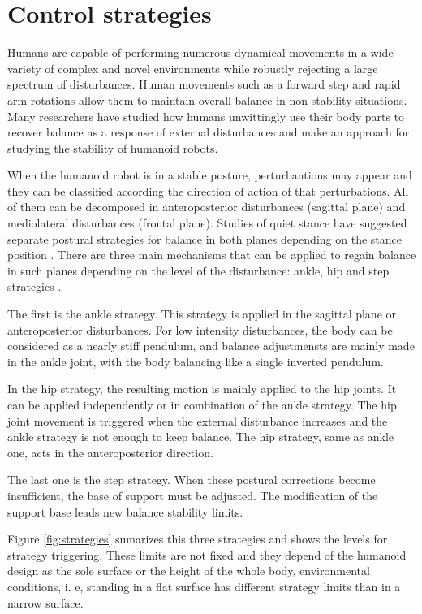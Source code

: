 \section{Control strategies}
Humans are capable of performing numerous dynamical movements in a wide variety of complex and novel environments while robustly rejecting a large spectrum of disturbances. Human movements such as a forward step and rapid arm rotations allow them to maintain overall balance in non-stability situations. Many researchers have studied how humans unwittingly use their body parts to recover balance as a response of external disturbances and make an approach for studying the stability of humanoid robots.

When the humanoid robot is in a stable posture, perturbantions may appear and they can be classified according the direction of action of that perturbations. All of them can be decomposed in anteroposterior disturbances (sagittal plane) and mediolateral disturbances (frontal plane). Studies of quiet stance have suggested separate postural strategies for balance in both planes depending on the stance position \cite{Winter1996}. There are three main mechanisms that can be applied to regain balance in such planes depending on the level of the disturbance: ankle, hip and step strategies \cite{Nenchev2008}.

The first is the ankle strategy. This strategy is applied in the sagittal plane or anteroposterior disturbances. For low intensity disturbances, the body can be considered as a nearly stiff pendulum, and balance adjustmensts are mainly made in the ankle joint, with the body balancing like a single inverted pendulum. 

In the hip strategy, the resulting motion is mainly applied to the hip joints. It can be applied independently or in combination of the ankle strategy. The hip joint movement is triggered when the external disturbance increases and the ankle strategy is not enough to keep balance. The hip strategy, same as ankle one, acts in the anteroposterior direction.

The last one is the step strategy. When these postural corrections become insufficient, the base of support must be adjusted. The modification of the support base leads new balance stability limits.

Figure \ref{fig:strategies} sumarizes this three strategies and shows the levels for strategy triggering. These limits are not fixed and they depend of the humanoid design as the sole surface or the height of the whole body, environmental conditions, i. e, standing in a flat surface has different strategy limits than in a narrow surface.

